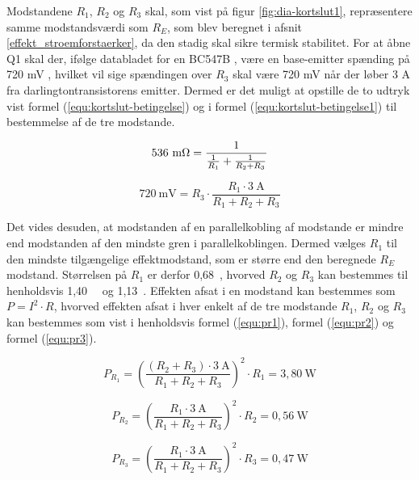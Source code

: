 Modstandene $R_1$, $R_2$ og $R_3$ skal, som vist på figur \ref{fig:dia-kortslut1}, repræsentere samme modstandsværdi som $R_E$, som blev beregnet i afsnit \ref{effekt_stroemforstaerker}, da den stadig skal sikre termisk stabilitet. For at åbne Q1 skal der, ifølge databladet for en BC547B \cite{bc547b-datablad}, være en base-emitter spænding på 720 mV , hvilket vil sige spændingen over $R_3$ skal være 720 mV når der løber 3 A fra darlingtontransistorens emitter. Dermed er det muligt at opstille de to udtryk vist formel (\ref{equ:kortslut-betingelse}) og i formel (\ref{equ:kortslut-betingelse1}) til bestemmelse af de tre modstande.

\begin{equation}
\label{equ:kortslut-betingelse}
\mathrm{536~m\ohm} = \frac{1}{\frac{1}{R_1}+\frac{1}{R_2 + R_3}}
\end{equation}

\begin{equation}
\label{equ:kortslut-betingelse1}
\mathrm{720~mV} = R_3 \cdot \frac{R_1 \cdot \mathrm{3~A}}{R_ 1+ R_2 + R_3}
\end{equation}

Det vides desuden, at modstanden af en parallelkobling af modstande er mindre end modstanden af den mindste gren i parallelkoblingen. Dermed vælges $R_1$ til den mindste tilgængelige effektmodstand, som er større end den beregnede $R_E$ modstand. Størrelsen på $R_1$ er derfor 0,68~\ohm, hvorved $R_2$ og $R_3$ kan bestemmes til henholdsvis 1,40~\ohm~ og 1,13~\ohm. Effekten afsat i en modstand kan bestemmes som $P = I^2 \cdot R$, hvorved effekten afsat i hver enkelt af de tre modstande $R_1$, $R_2$ og $R_3$ kan bestemmes som vist i henholdsvis formel (\ref{equ:pr1}), formel (\ref{equ:pr2}) og formel (\ref{equ:pr3}).

\begin{equation}
\label{equ:pr1}
P_{R_1} = \left(\frac{(R_2 + R_3) \cdot \mathrm{3~A}}{R_1 + R_2 + R_3}\right)^2 \cdot R_1 = \mathrm{3,80~W}
\end{equation}

\begin{equation}
\label{equ:pr2}
P_{R_2} = \left(\frac{R_1 \cdot \mathrm{3~A}}{R_1 + R_2 + R_3}\right)^2 \cdot R_2 = \mathrm{0,56~W}
\end{equation}

\begin{equation}
\label{equ:pr3}
P_{R_3} = \left(\frac{R_1 \cdot \mathrm{3~A}}{R_1 + R_2 + R_3}\right)^2 \cdot R_3 = \mathrm{0,47~W}
\end{equation}

